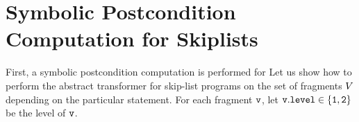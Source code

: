 \section{Symbolic Postcondition Computation for Skiplists}

 First, a symbolic postcondition computation is performed for 
Let us show how to perform the abstract transformer for skip-list programs on the set of fragments $V$ depending on the particular statement.
For each fragment $\tt v$, let $\tt v.level \in \{1,2\}$ be the level of $\tt v$.

